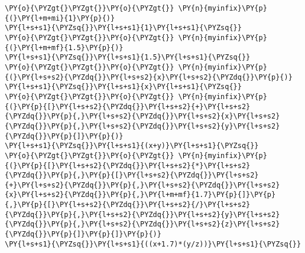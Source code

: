 \begin{Verbatim}[commandchars=\\\{\}]
\PY{o}{\PYZgt{}\PYZgt{}}\PY{o}{\PYZgt{}} \PY{n}{myinfix}\PY{p}{(}\PY{l+m+mi}{1}\PY{p}{)}
\PY{l+s+s1}{\PYZsq{}}\PY{l+s+s1}{1}\PY{l+s+s1}{\PYZsq{}}
\PY{o}{\PYZgt{}\PYZgt{}}\PY{o}{\PYZgt{}} \PY{n}{myinfix}\PY{p}{(}\PY{l+m+mf}{1.5}\PY{p}{)}
\PY{l+s+s1}{\PYZsq{}}\PY{l+s+s1}{1.5}\PY{l+s+s1}{\PYZsq{}}
\PY{o}{\PYZgt{}\PYZgt{}}\PY{o}{\PYZgt{}} \PY{n}{myinfix}\PY{p}{(}\PY{l+s+s2}{\PYZdq{}}\PY{l+s+s2}{x}\PY{l+s+s2}{\PYZdq{}}\PY{p}{)}
\PY{l+s+s1}{\PYZsq{}}\PY{l+s+s1}{x}\PY{l+s+s1}{\PYZsq{}}
\PY{o}{\PYZgt{}\PYZgt{}}\PY{o}{\PYZgt{}} \PY{n}{myinfix}\PY{p}{(}\PY{p}{[}\PY{l+s+s2}{\PYZdq{}}\PY{l+s+s2}{+}\PY{l+s+s2}{\PYZdq{}}\PY{p}{,}\PY{l+s+s2}{\PYZdq{}}\PY{l+s+s2}{x}\PY{l+s+s2}{\PYZdq{}}\PY{p}{,}\PY{l+s+s2}{\PYZdq{}}\PY{l+s+s2}{y}\PY{l+s+s2}{\PYZdq{}}\PY{p}{]}\PY{p}{)}
\PY{l+s+s1}{\PYZsq{}}\PY{l+s+s1}{(x+y)}\PY{l+s+s1}{\PYZsq{}}
\PY{o}{\PYZgt{}\PYZgt{}}\PY{o}{\PYZgt{}} \PY{n}{myinfix}\PY{p}{(}\PY{p}{[}\PY{l+s+s2}{\PYZdq{}}\PY{l+s+s2}{*}\PY{l+s+s2}{\PYZdq{}}\PY{p}{,}\PY{p}{[}\PY{l+s+s2}{\PYZdq{}}\PY{l+s+s2}{+}\PY{l+s+s2}{\PYZdq{}}\PY{p}{,}\PY{l+s+s2}{\PYZdq{}}\PY{l+s+s2}{x}\PY{l+s+s2}{\PYZdq{}}\PY{p}{,}\PY{l+m+mf}{1.7}\PY{p}{]}\PY{p}{,}\PY{p}{[}\PY{l+s+s2}{\PYZdq{}}\PY{l+s+s2}{/}\PY{l+s+s2}{\PYZdq{}}\PY{p}{,}\PY{l+s+s2}{\PYZdq{}}\PY{l+s+s2}{y}\PY{l+s+s2}{\PYZdq{}}\PY{p}{,}\PY{l+s+s2}{\PYZdq{}}\PY{l+s+s2}{z}\PY{l+s+s2}{\PYZdq{}}\PY{p}{]}\PY{p}{]}\PY{p}{)}
\PY{l+s+s1}{\PYZsq{}}\PY{l+s+s1}{((x+1.7)*(y/z))}\PY{l+s+s1}{\PYZsq{}}
\end{Verbatim}
